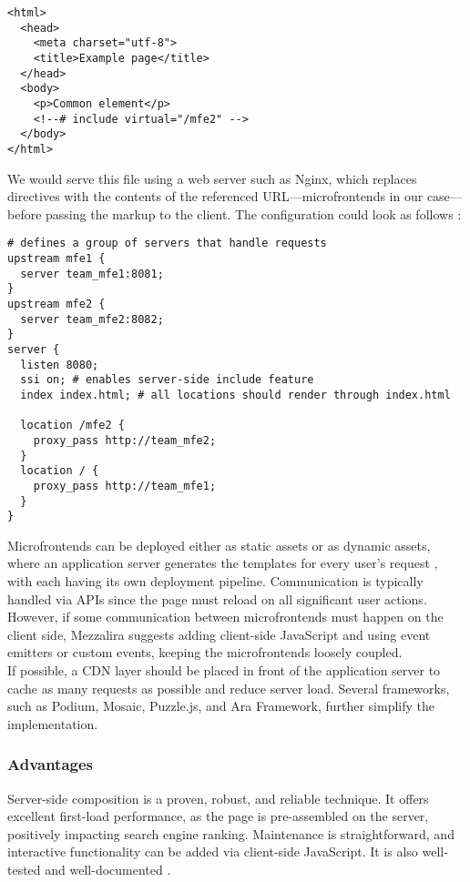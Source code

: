 \begin{verbatim}
<html>
  <head>
    <meta charset="utf-8">
    <title>Example page</title>
  </head>
  <body>
    <p>Common element</p>
    <!--# include virtual="/mfe2" -->
  </body>
</html>
\end{verbatim}
We would serve this file using a web server such as Nginx, which replaces directives with the contents of the referenced URL—microfrontends in our case—before passing the markup to the client. The configuration could look as follows \cite{Jackson}:

\begin{verbatim}
# defines a group of servers that handle requests
upstream mfe1 { 
  server team_mfe1:8081;
}
upstream mfe2 {
  server team_mfe2:8082;
}
server {
  listen 8080;
  ssi on; # enables server-side include feature
  index index.html; # all locations should render through index.html

  location /mfe2 {
    proxy_pass http://team_mfe2;
  }
  location / {
    proxy_pass http://team_mfe1;
  }
}
\end{verbatim}
Microfrontends can be deployed either as static assets or as dynamic assets, where an application server generates the templates for every user's request \cite{MezzaliraBuildingMf}, with each having its own deployment pipeline. Communication is typically handled via APIs since the page must reload on all significant user actions. However, if some communication between microfrontends must happen on the client side, Mezzalira \cite{MezzaliraBuildingMf} suggests adding client-side JavaScript and using event emitters or custom events, keeping the microfrontends loosely coupled. \\

\noindent
If possible, a CDN layer should be placed in front of the application server to cache as many requests as possible and reduce server load. Several frameworks, such as Podium, Mosaic, Puzzle.js, and Ara Framework, further simplify the implementation.

\subsubsection{Advantages}
Server-side composition is a proven, robust, and reliable technique. It offers excellent first-load performance, as the page is pre-assembled on the server, positively impacting search engine ranking. Maintenance is straightforward, and interactive functionality can be added via client-side JavaScript. It is also well-tested and well-documented \cite{Geers}\cite{MezzaliraBuildingMf}.

